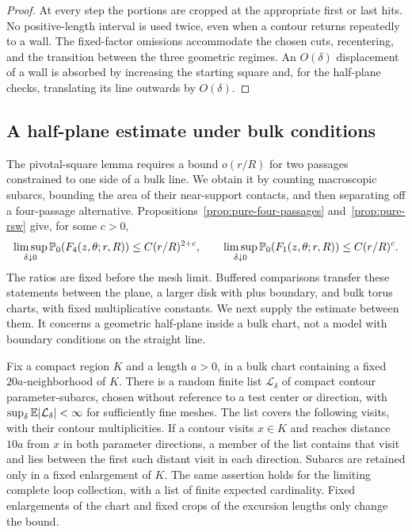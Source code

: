 \begin{proof}
At every step the portions are cropped at the appropriate
first or last hits.  No positive-length interval is used
twice, even when a contour returns repeatedly to a wall.
The fixed-factor omissions accommodate the chosen cuts,
recentering, and the transition between the three geometric
regimes.  An $O(\delta)$ displacement of a wall is absorbed
by increasing the starting square and, for the half-plane
checks, translating its line outwards by $O(\delta)$.
\end{proof}

\subsection{A half-plane estimate under bulk conditions}

The pivotal-square lemma requires a bound $o(r/R)$ for two passages
constrained to one side of a bulk line.  We obtain it by counting
macroscopic subarcs, bounding the area of their near-support contacts,
and then separating off a four-passage alternative.
Propositions~\ref{prop:pure-four-passages} and~\ref{prop:pure-rsw}
give, for some $c>0$,
\begin{equation}
 \limsup_{\delta\downarrow0}\P_0(F_4(z,\theta;r,R))
       \leq C(r/R)^{2+c},
 \qquad
 \limsup_{\delta\downarrow0}\P_0(F_1(z,\theta;r,R))
       \leq C(r/R)^c.
 \label{eq:stability-pure-41}
\end{equation}
The ratios are fixed before the mesh limit.  Buffered comparisons
transfer these statements between the plane, a larger disk with plus
boundary, and bulk torus charts, with fixed multiplicative constants.
We next supply the estimate between them.  It concerns a geometric
half-plane inside a bulk chart, not a model with boundary conditions on
the straight line.

\begin{lemma}
\label{lem:stability-counts}
Fix a compact region $K$ and a length $a>0$, in a bulk chart containing
a fixed $20a$-neighborhood of $K$.  There is a random finite list
$\mathcal L_\delta$ of compact contour parameter-subarcs, chosen without
reference to a test center or direction, with
$\sup_\delta\E|\mathcal L_\delta|<\infty$ for sufficiently fine meshes.
The list covers the following visits, with their contour multiplicities.
If a contour visits $x\in K$ and reaches distance $10a$ from $x$ in
both parameter directions, a member of the list contains that visit and
lies between the first such distant visit in each direction.  Subarcs
are retained only in a fixed enlargement of $K$.  The same assertion
holds for the limiting complete loop collection, with a list of finite
expected cardinality.  Fixed enlargements of the chart and fixed crops
of the excursion lengths only change the bound.
\end{lemma}


